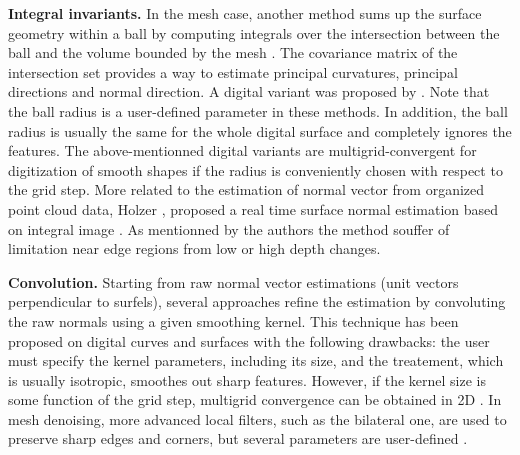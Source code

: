 \noindent\textbf{Integral invariants.}
In the mesh case, another method sums up the surface geometry within a ball by 
computing integrals over the intersection between the ball and the volume
bounded by the mesh \cite{Pottmann2009}. The covariance matrix of the intersection set 
provides a way to estimate principal curvatures, principal directions and normal direction.
A digital variant was proposed by \citeauthor*{Lachaud2017} \cite{Lachaud2017}.
%
Note that the ball radius is a user-defined parameter in these
methods. In addition, the ball radius is usually the same for
the whole digital surface and completely ignores the features.
The above-mentionned digital variants \cite{Cuel2015,Lachaud2017}
are multigrid-convergent for digitization of smooth shapes if
the radius is conveniently chosen with respect to
the grid step. More related to the estimation of normal vector from organized point cloud data, Holzer {\etal}, proposed a real time surface normal estimation based on integral image \cite{holzer_adaptive_2012}. As mentionned by the authors the method souffer of limitation near edge regions from low or high depth changes.  


\noindent\textbf{Convolution.}
Starting from raw normal vector estimations (\eg unit
vectors perpendicular to surfels), several approaches refine the
estimation by convoluting the raw normals using a given smoothing
kernel. This technique has been proposed on digital curves
\cite{Esbelin2011,Esbelin2016} and surfaces
\cite{papierthese,Fourey2009} with the following drawbacks:
the user must specify the kernel parameters, including its size,
and the treatement, which is usually isotropic, smoothes out
sharp features. However, if the kernel size is some function of the
grid step, multigrid convergence can be obtained in 2D \cite{Esbelin2011}.
In mesh denoising, more advanced local filters, such as the bilateral one,
are used to preserve sharp edges and corners, but several parameters
are user-defined \cite{fleishman2003bilateral,zheng2011bilateral}.

